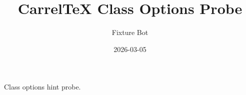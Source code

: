 \documentclass[twocolumn]{classoptsdemo}
\title{CarrelTeX Class Options Probe}
\author{Fixture Bot}
\date{2026-03-05}
\begin{document}
\maketitle

Class options hint probe.
\end{document}
